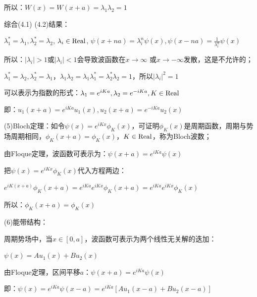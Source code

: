 所以：$W\left( x \right) = W\left( {x + a} \right) = \lambda _1 \lambda _2  = 1$

综合(4.1) (4.2)结果：

$\lambda _1 ^*  = \lambda _1 ,\lambda _2 ^*  = \lambda _2 $, $\lambda _i  \in {\rm{Real}}$, $\psi \left( {x + na} \right) = \lambda _i ^n \psi \left( x \right),\psi \left( {x - na} \right) = \frac{1}{{\lambda _i ^n }}\psi \left( x \right)$

所以：$\left| {\lambda _i } \right| > 1$或$\left| {\lambda _i } \right| < 1$会导致波函数在$x \to \infty $
或$x \to  - \infty $发散，这是不允许的；

$\lambda _1 ^*  = \lambda _2 ,\lambda _2 ^*  = \lambda _1 $，$\lambda _1 \lambda _2  = \lambda _1 \lambda _1 ^*  = \lambda _2 ^* \lambda _2  = 1$，所以$\left| {\lambda _i } \right|^2  = 1$

可以表示为指数的形式：$\lambda _1  = e^{iKa} ,\lambda _2  = e^{ - iKa} ,K \in {\rm{Real}}$

即：$u_1 \left( {x + a} \right) = e^{iKa} u_1 \left( x \right),u_2 \left( {x + a} \right) = e^{ - iKa} u_2 \left( x \right)$

(5)Bloch定理：如令$\psi \left( x \right) = e^{iKx} \phi _K \left( x \right)$，可证明$\phi _K \left( x \right)$是周期函数，周期与势场周期相同，$\phi _K \left( {x + a} \right) = \phi _K \left( x \right)$，$K \in {\rm{Real}}$，称为Bloch波数；


由Floque定理，波函数可表示为：$\psi \left( {x + a} \right) = e^{iKa} \psi \left( x \right)$

把$\psi \left( x \right) = e^{iKx} \phi _K \left( x \right)$代入方程两边：

$e^{iK\left( {x + a} \right)} \phi _K \left( {x + a} \right) = e^{iKa} e^{iKx} \phi _K \left( {x + a} \right) = e^{iKa} e^{iKx} \phi _K \left( x \right)$

所以：$\phi _K \left( {x + a} \right) = \phi _K \left( x \right)$

(6)能带结构：


周期势场中，当$x \in \left[ {0,a} \right]$，波函数可表示为两个线性无关解的迭加：


$\psi \left( x \right) = Au_1 \left( x \right) + Bu_2 \left( x \right)$

由Floque定理，区间平移$a$：$\psi \left( {x + a} \right) = e^{iKa} \psi \left( x \right)$

即：$\psi \left( x \right) = e^{iKa} \psi \left( {x - a} \right) = e^{iKa} \left[ {Au_1 \left( {x - a} \right) + Bu_2 \left( {x - a} \right)} \right]$

